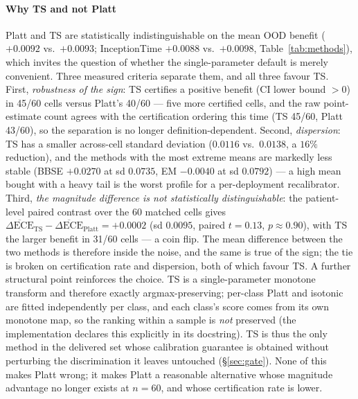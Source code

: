 \documentclass[final,5p,times,nonatbib]{elsarticle}
\begin{document}
\paragraph{Why TS and not Platt} Platt and TS are statistically
indistinguishable on the mean OOD benefit ($+0.0092$ vs.\ $+0.0093$;
InceptionTime $+0.0088$ vs.\ $+0.0098$, Table~\ref{tab:methods}), which
invites the
question of whether the single-parameter default is merely convenient.
Three measured criteria separate them, and all three favour TS. First,
\emph{robustness of the sign}: TS certifies a positive benefit (CI
lower bound $>0$) in 45/60 cells versus Platt's 40/60 --- five more
certified cells, and the raw point-estimate count agrees with the
certification ordering this time (TS 45/60, Platt 43/60), so the
separation is no longer definition-dependent. Second, \emph{dispersion}:
TS has a smaller across-cell
standard deviation ($0.0116$ vs.\ $0.0138$, a $16\%$ reduction), and the
methods with the most extreme means are markedly less stable
(BBSE $+0.0270$ at sd $0.0735$, EM $-0.0040$ at sd $0.0792$) ---
a high mean bought with a heavy tail is the worst profile for a
per-deployment recalibrator. Third, \emph{the magnitude difference is not
statistically distinguishable}: the patient-level paired contrast over
the 60 matched cells gives
$\overline{\Delta\text{ECE}}_{\text{TS}}-\overline{\Delta\text{ECE}}_{\text{Platt}}
= +0.0002$ (sd $0.0095$, paired $t=0.13$, $p\approx0.90$), with TS the
larger benefit in 31/60 cells --- a coin flip. The mean
difference between the two methods is therefore inside the noise, and
the same is true of the sign; the tie is broken on
certification rate and dispersion, both of which favour TS. A further
structural point reinforces the choice. TS is a single-parameter
monotone transform and therefore exactly argmax-preserving; per-class
Platt and isotonic are fitted independently per class, and each class's
score comes from its own monotone map, so the ranking within a sample is
\emph{not} preserved (the implementation declares this explicitly in its
docstring). TS is thus the only method
in the delivered set whose calibration guarantee is obtained without
perturbing the discrimination it leaves untouched
(\S\ref{sec:gate}). None of this makes Platt wrong; it makes Platt a
reasonable alternative whose magnitude advantage no longer exists at
$n=60$, and whose certification rate is lower.

\end{document}
